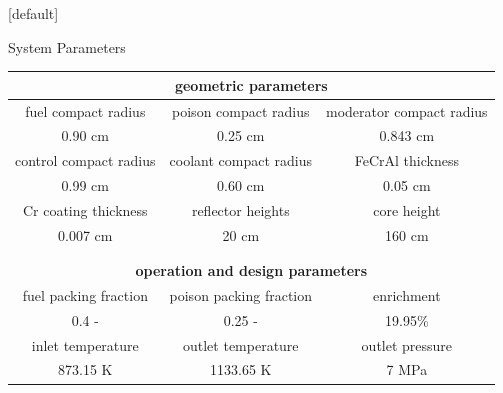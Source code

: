 \documentclass[9pt,t,aspectratio=169]{beamer}
\makeatletter
\newenvironment{withoutheadline}{
       \setbeamertemplate{headline}[default]
       \def\beamer@entrycode{\vspace*{-\headheight}}
    }{}
\makeatother
\begin{document}
\begin{withoutheadline}
\begin{frame}{System Parameters}
    \begin{table}[h]
        \centering
        \begin{tabular}{|c|c|c|}
            \hline
            \multicolumn{3}{|c|}{\textbf{geometric parameters}} \\
            \hline
            fuel compact radius & poison compact radius & moderator compact radius  \\
            0.90 cm & 0.25 cm   & 0.843 cm  \\
            \hline
            control compact radius & coolant compact radius & FeCrAl thickness \\
            0.99 cm    & 0.60 cm & 0.05 cm \\
            \hline
            Cr coating thickness & reflector heights & core height \\
            \hline
            0.007 cm & 20 cm & 160 cm \\
            \hline
        \multicolumn{3}{c}{} \\
        \multicolumn{3}{c}{} \\
        \hline
        \multicolumn{3}{|c|}{\textbf{operation and design parameters}} \\
        \hline
        fuel packing fraction & poison packing fraction  & enrichment \\
        \hline
        0.4 -  & 0.25 - &  19.95\% \\
        \hline
        inlet temperature & outlet temperature & outlet pressure \\
        \hline
        873.15 K & 1133.65 K  & 7 MPa \\
        \hline
        \end{tabular}
        \label{tab:operational_params}
    \end{table}
\end{frame}
\end{withoutheadline}
\end{document}
